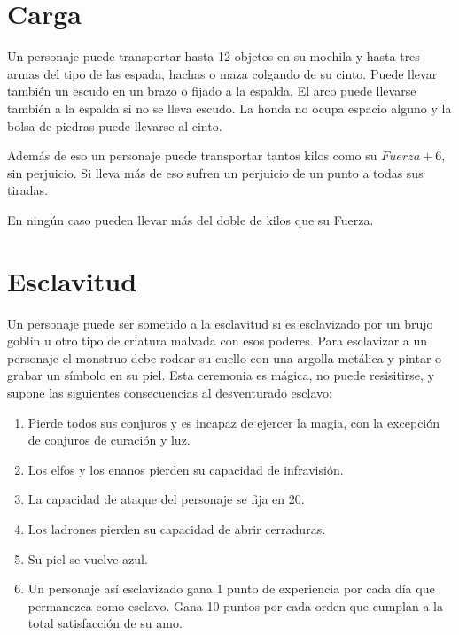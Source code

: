 \begin{multicols}{2}
\begin{table*}[p]
\end{table*}

\section{Carga}

Un personaje puede transportar hasta 12 objetos en su mochila y hasta tres armas
del tipo de las espada, hachas o maza colgando de su cinto. Puede llevar también
un escudo en un brazo o fijado a la espalda. El arco puede llevarse también a la
espalda si no se lleva escudo. La honda no ocupa espacio alguno y la bolsa de
piedras puede llevarse al cinto.

Además de eso un personaje puede transportar tantos kilos como su $Fuerza + 6$, sin
perjuicio. Si lleva más de eso sufren un perjuicio de un punto a todas sus tiradas.

En ningún caso pueden llevar más del doble de kilos que su Fuerza.

\section{Esclavitud}\label{s:esclavitud}

Un personaje puede ser sometido a la esclavitud si es esclavizado por un brujo
goblin u otro tipo de criatura malvada con esos poderes. Para
esclavizar a un personaje el monstruo debe rodear su cuello con una argolla
metálica y pintar o grabar un símbolo en su piel. Esta ceremonia es mágica, no
puede resisitirse, y supone las siguientes consecuencias al desventurado esclavo:

\begin{enumerate}[label={\alph*)}]

\item Pierde todos sus conjuros y es incapaz de ejercer la magia, con la excepción de conjuros de curación y luz.

\item Los elfos y los enanos pierden su capacidad de infravisión.

\item La capacidad de ataque del personaje se fija en 20.

\item Los ladrones pierden su capacidad de abrir cerraduras.

\item Su piel se vuelve azul.

\item Un personaje así esclavizado gana 1 punto de experiencia por cada día que
permanezca como esclavo. Gana 10 puntos por cada orden que cumplan a la total
satisfacción de su amo.


\end{enumerate}
\end{multicols}

